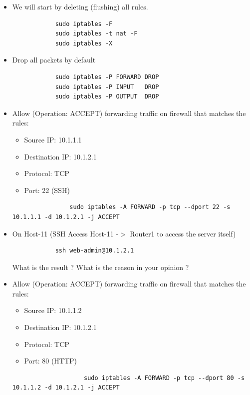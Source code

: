 \begin{itemize}
	\item We will start by deleting (flushing) all rules.
	\begin{verbatim}
			sudo iptables -F
			sudo iptables -t nat -F
			sudo iptables -X
	\end{verbatim}

	\item Drop all packets by default
	\begin{verbatim}
			sudo iptables -P FORWARD DROP
			sudo iptables -P INPUT   DROP
			sudo iptables -P OUTPUT  DROP
	\end{verbatim}

	\item Allow (Operation: ACCEPT) forwarding traffic on firewall that matches the rules:
		\begin{itemize}
			\item Source IP: 10.1.1.1
			\item Destination IP: 10.1.2.1
			\item	Protocol: TCP
			\item Port: 22 (SSH)
		\end{itemize}
		\begin{verbatim}
				sudo iptables -A FORWARD -p tcp --dport 22 -s 10.1.1.1 -d 10.1.2.1 -j ACCEPT
		\end{verbatim}

		\item On Host-11 (SSH Access Host-11 -$>$ Router1 to access the server itself)
		\begin{verbatim}
		    ssh web-admin@10.1.2.1
		\end{verbatim}

		What is the result ? What is the reason in your opinion ?

		\item Allow (Operation: ACCEPT) forwarding traffic on firewall that matches the rules:
			\begin{itemize}
				\item Source IP: 10.1.1.2
				\item Destination IP: 10.1.2.1
				\item	Protocol: TCP
				\item Port: 80 (HTTP)
			\end{itemize}
			\begin{verbatim}
					sudo iptables -A FORWARD -p tcp --dport 80 -s 10.1.1.2 -d 10.1.2.1 -j ACCEPT
			\end{verbatim}


\end{itemize}
